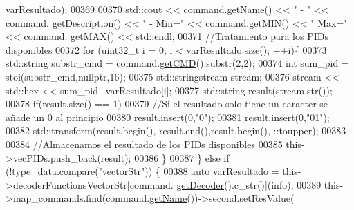 \begin{DoxyCode}
{{{{{{{{{{      varResultado);
00369 
00370                                     std::cout << command.\hyperlink{classCommands_adf3d8a96310b1f4e57a6ecf0f2f153ea}{getName}() << \textcolor{stringliteral}{" - "} << command.
      \hyperlink{classCommands_ad82fe7dfcf1908423bdb59d048020e26}{getDescription}() << \textcolor{stringliteral}{" - Min="} << command.\hyperlink{classCommands_af0a1e2ea65b5a57997c721a8d77a1013}{getMIN}() << \textcolor{stringliteral}{" Max="} << command.
      \hyperlink{classCommands_afbad1051313d0cdecba276384cb7fc6b}{getMAX}() << std::endl;
00371                                     \textcolor{comment}{//Tratamiento para los PIDs disponibles}
00372                                     \textcolor{keywordflow}{for} (uint32\_t i = 0; i < varResultado.size(); ++i)\{
00373                                         std::string substr\_cmd = command.\hyperlink{classCommands_a9aee21ab91fdfc8e9daa59e1e8f20b73}{getCMD}().substr(2,2);
00374                                         \textcolor{keywordtype}{int} sum\_pid = stoi(substr\_cmd,\textcolor{keyword}{nullptr},16);
00375                                         std::stringstream stream;
00376                                         stream << std::hex << sum\_pid+varResultado[i];
00377                                         std::string result(stream.str());
00378                                         \textcolor{keywordflow}{if}(result.size() == 1)
00379                                         \textcolor{comment}{//Si el resultado solo tiene un caracter se añade un 0 al principio}
00380                                             result.insert(0,\textcolor{stringliteral}{"0"});
00381                                         result.insert(0,\textcolor{stringliteral}{"01"});
00382                                         std::transform(result.begin(), result.end(),result.begin(), 
      ::toupper);
00383 
00384                                         \textcolor{comment}{//Almacenamos el resultado de los PIDs disponibles}
00385                                         this->vecPIDs.push\_back(result);
00386                                     \}
00387                                 \} \textcolor{keywordflow}{else} \textcolor{keywordflow}{if} (!type\_data.compare(\textcolor{stringliteral}{"vectorStr"})) \{
00388                                     \textcolor{keyword}{auto} varResultado = this->decoderFunctionsVectorStr[command.
      \hyperlink{classCommands_a8b4c2a655d8dd3de334338d6684d469c}{getDecoder}().c\_str()](info);
00389                                     this->map\_commands.find(command.\hyperlink{classCommands_adf3d8a96310b1f4e57a6ecf0f2f153ea}{getName}())->second.setResValue(
}}}}}}}}}}
\end{DoxyCode}
